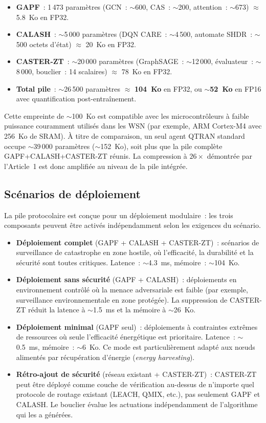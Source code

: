 \begin{itemize}
    \item \textbf{GAPF}~: 1\,473 paramètres (GCN~: $\sim$600, CAS~: $\sim$200, attention~: $\sim$673) $\approx$ 5.8~Ko en FP32.
    \item \textbf{CALASH}~: $\sim$5\,000 paramètres (DQN CARE~: $\sim$4\,500, automate SHDR~: $\sim$500 octets d'état) $\approx$ 20~Ko en FP32.
    \item \textbf{CASTER-ZT}~: $\sim$20\,000 paramètres (GraphSAGE~: $\sim$12\,000, évaluateur~: $\sim$8\,000, bouclier~: 14 scalaires) $\approx$ 78~Ko en FP32.
    \item \textbf{Total pile}~: $\sim$26\,500 paramètres $\approx$ \textbf{104~Ko} en FP32, ou $\sim$\textbf{52~Ko} en FP16 avec quantification post-entraînement.
\end{itemize}

Cette empreinte de $\sim$100~Ko est compatible avec les microcontrôleurs à faible puissance couramment utilisés dans les WSN (par exemple, ARM Cortex-M4 avec 256~Ko de SRAM). À titre de comparaison, un seul agent QTRAN standard occupe $\sim$39\,000 paramètres ($\sim$152~Ko), soit plus que la pile complète GAPF+CALASH+CASTER-ZT réunis. La compression à $26\times$ démontrée par l'Article~1 est donc amplifiée au niveau de la pile intégrée.

\subsection{Scénarios de déploiement}

La pile protocolaire est conçue pour un déploiement modulaire~: les trois composants peuvent être activés indépendamment selon les exigences du scénario.

\begin{itemize}
    \item \textbf{Déploiement complet} (GAPF + CALASH + CASTER-ZT)~: scénarios de surveillance de catastrophe en zone hostile, où l'efficacité, la durabilité et la sécurité sont toutes critiques. Latence~: $\sim$4.3~ms, mémoire~: $\sim$104~Ko.
    \item \textbf{Déploiement sans sécurité} (GAPF + CALASH)~: déploiements en environnement contrôlé où la menace adversariale est faible (par exemple, surveillance environnementale en zone protégée). La suppression de CASTER-ZT réduit la latence à $\sim$1.5~ms et la mémoire à $\sim$26~Ko.
    \item \textbf{Déploiement minimal} (GAPF seul)~: déploiements à contraintes extrêmes de ressources où seule l'efficacité énergétique est prioritaire. Latence~: $\sim$0.5~ms, mémoire~: $\sim$6~Ko. Ce mode est particulièrement adapté aux n\oe{}uds alimentés par récupération d'énergie (\emph{energy harvesting}).
    \item \textbf{Rétro-ajout de sécurité} (réseau existant + CASTER-ZT)~: CASTER-ZT peut être déployé comme couche de vérification au-dessus de n'importe quel protocole de routage existant (LEACH, QMIX, etc.), pas seulement GAPF et CALASH. Le bouclier évalue les actuations indépendamment de l'algorithme qui les a générées.
\end{itemize}


